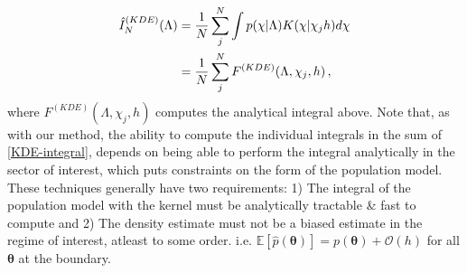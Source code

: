 \documentclass[twocolumn,usenames,dvipsnames,linenumbers]{aastex631}
\newcommand{\btheta}{\boldsymbol{\theta}}
\begin{document}
\begin{equation}
	\label{KDE-integral}
	\begin{split}
		\hat{I}^{({\tiny KDE})}_{N}(\Lambda) &= \frac{1}{N} \sum_j^N \int p(\chi| \Lambda)  K(\chi  | \chi_j h) d\chi \\
		&= \frac{1}{N} \sum_j^N  F^{(KDE)}(\Lambda, \chi_j, h)\,,
	\end{split}
\end{equation}
where $F^{(KDE)}(\Lambda, \chi_j, h)$ computes the analytical integral above.
Note that, as with our method, the ability to compute the individual integrals in the sum of \eqref{KDE-integral}, depends on being able to perform the integral analytically in the sector of interest, which puts constraints on the form of the population model. These techniques generally have two requirements: 1) The integral of the population model with the kernel must be analytically tractable \& fast to compute and 2) The density estimate must not be a biased estimate in the regime of interest, atleast to some order. i.e. $\mathbb{E}[\hat{p}(\btheta)] =  p(\btheta) + \mathcal{O}(h)$ for all $\btheta$ at the boundary.
\end{document}
